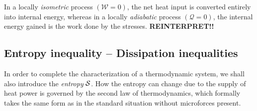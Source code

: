 \begin{remark} In a locally {\em isometric} process $({\mathcal W}=0)$,
the net heat input is converted entirely into internal energy,
whereas in a locally {\em adiabatic} process $({\mathcal Q}=0)$, the
internal energy gained is the work done by the stresses. \textbf{REINTERPRET!!}
\end{remark}


\subsection{Entropy inequality -- Dissipation inequalities}
In order to complete the characterization of a thermodynamic system,
we shall also introduce the {\em entropy} ${\mathcal S}$. 
How the entropy can change due to the supply of heat power is governed by the
second law of thermodynamics, which formally takes the same form as in the 
standard situation without microforces present.


